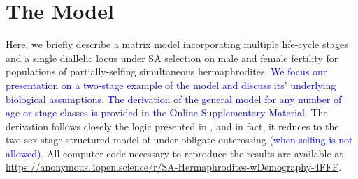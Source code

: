 \documentclass[11pt]{article}
\begin{document}




\section*{The Model}

Here, we briefly describe a matrix model incorporating multiple life-cycle stages and a single diallelic locus under SA selection on male and female fertility for populations of partially-selfing simultaneous hermaphrodites. \textcolor{blue}{We focus our presentation on a two-stage example of the model and discuss its' underlying biological assumptions. The derivation of the general model for any number of age or stage classes is provided in the Online Supplementary Material.} The derivation follows closely the logic presented in \citet{deVriesCaswell2019a, deVriesCaswell2019b}, and in fact, it reduces to the two-sex stage-structured model of \citet{deVriesCaswell2019a} under obligate outcrossing \textcolor{blue}{(when selfing is not allowed)}. All computer code necessary to reproduce the results are available at \url{https://anonymous.4open.science/r/SA-Hermaphrodites-wDemography-4FFF}.%
\end{document}
